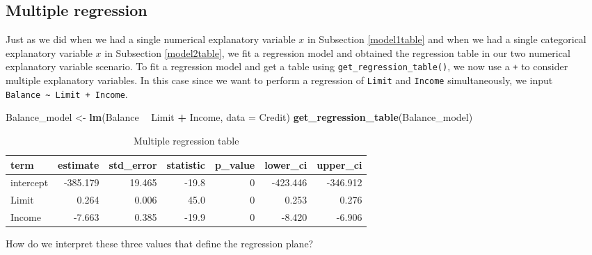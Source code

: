 \documentclass[12pt,]{krantz}
\makeatletter
\newenvironment{Shaded}{\begin{snugshade}}{\end{snugshade}}
\newcommand{\KeywordTok}[1]{\textcolor[rgb]{0.27,0.27,0.27}{\textbf{#1}}}
\newcommand{\DataTypeTok}[1]{\textcolor[rgb]{0.27,0.27,0.27}{#1}}
\newcommand{\StringTok}[1]{\textcolor[rgb]{0.5,0.5,0.5}{#1}}
\newcommand{\OperatorTok}[1]{\textcolor[rgb]{0.43,0.43,0.43}{\textbf{#1}}}
\newcommand{\NormalTok}[1]{#1}
\newenvironment{kframe}{%
\medskip{}
\setlength{\fboxsep}{.8em}
 \def\at@end@of@kframe{}%
 \ifinner\ifhmode%
  \def\at@end@of@kframe{\end{minipage}}%
  \begin{minipage}{\columnwidth}%
 \fi\fi%
 \def\FrameCommand##1{\hskip\@totalleftmargin \hskip-\fboxsep
 \colorbox{shadecolor}{##1}\hskip-\fboxsep
     \hskip-\linewidth \hskip-\@totalleftmargin \hskip\columnwidth}%
 \MakeFramed {\advance\hsize-\width
   \@totalleftmargin\z@ \linewidth\hsize
   \@setminipage}}%
 {\par\unskip\endMakeFramed%
 \at@end@of@kframe}
\renewenvironment{Shaded}{\begin{kframe}}{\end{kframe}}
\theoremstyle{definition}
\theoremstyle{definition}
\theoremstyle{definition}
\theoremstyle{remark}
\makeatother
\begin{document}
\subsection{Multiple regression}\label{model3table}

Just as we did when we had a single numerical explanatory variable \(x\)
in Subsection \ref{model1table} and when we had a single categorical
explanatory variable \(x\) in Subsection \ref{model2table}, we fit a
regression model and obtained the regression table in our two numerical
explanatory variable scenario. To fit a regression model and get a table
using \texttt{get\_regression\_table()}, we now use a \texttt{+} to
consider multiple explanatory variables. In this case since we want to
perform a regression of \texttt{Limit} and \texttt{Income}
simultaneously, we input
\texttt{Balance\ \textasciitilde{}\ Limit\ +\ Income}.

\begin{Shaded}
\begin{Highlighting}[]
\NormalTok{Balance_model <-}\StringTok{ }\KeywordTok{lm}\NormalTok{(Balance }\OperatorTok{~}\StringTok{ }\NormalTok{Limit }\OperatorTok{+}\StringTok{ }\NormalTok{Income, }\DataTypeTok{data =}\NormalTok{ Credit)}
\KeywordTok{get_regression_table}\NormalTok{(Balance_model)}
\end{Highlighting}
\end{Shaded}

\begin{table}[H]

\caption{\label{tab:model3-table-output}Multiple regression table}
\centering
\fontsize{10}{12}\selectfont
\begin{tabular}[t]{lrrrrrr}
\toprule
term & estimate & std\_error & statistic & p\_value & lower\_ci & upper\_ci\\
\midrule
intercept & -385.179 & 19.465 & -19.8 & 0 & -423.446 & -346.912\\
Limit & 0.264 & 0.006 & 45.0 & 0 & 0.253 & 0.276\\
Income & -7.663 & 0.385 & -19.9 & 0 & -8.420 & -6.906\\
\bottomrule
\end{tabular}
\end{table}

How do we interpret these three values that define the regression plane?
\end{document}
